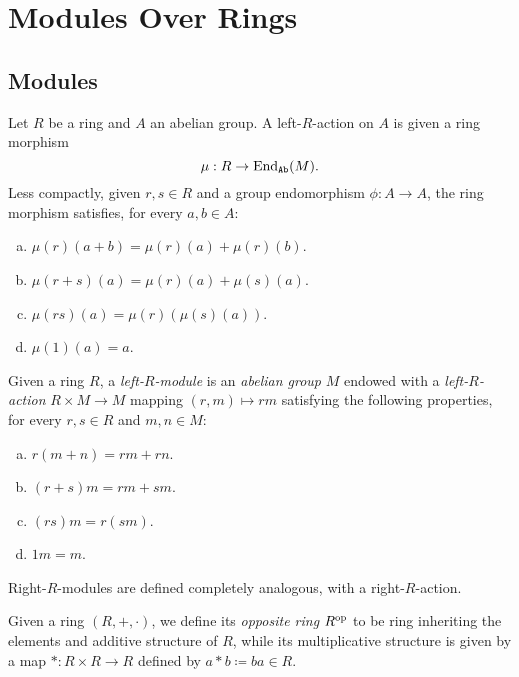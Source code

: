 \section{Modules Over Rings}

\subsection{Modules}

\begin{definition}
    \label{def:ring-action}
    Let \(R\) be a ring and \(A\) an abelian group. A left-\(R\)-action on \(A\) is
    given a ring morphism
    \[
        \mu: R \to \operatorname{End}_{{\texttt{Ab}}}(M).
    \]
    Less compactly, given \(r, s \in R\) and a group endomorphism \(\phi: A \to A\),
    the ring morphism satisfies, for every \(a, b \in A\):
    \begin{enumerate}[(a)]\setlength\itemsep{0em}
        \item \(\mu(r)(a + b) = \mu(r)(a) + \mu(r)(b)\).
        \item \(\mu(r + s)(a) = \mu(r)(a) + \mu(s)(a)\).
        \item \(\mu(r s)(a) = \mu(r)(\mu(s)(a))\).
        \item \(\mu(1)(a) = a\).
    \end{enumerate}
\end{definition}

\begin{definition}[Module]
    \label{def:module}
    Given a ring \(R\), a \emph{left-\(R\)-module} is an \emph{abelian group} \(M\)
    endowed with a \emph{left-\(R\)-action} \(R \times M \to M\) mapping
    \((r, m) \mapsto r m\) satisfying the following properties, for every
    \(r, s \in R\) and \(m, n \in M\):
    \begin{enumerate}[(a)]\setlength\itemsep{0em}
        \item \(r (m + n) = r m + r n\).
        \item \((r + s) m = r m + s m\).
        \item \((r s) m = r (s m)\).
        \item \(1 m = m\).
    \end{enumerate}
    Right-\(R\)-modules are defined completely analogous, with a right-\(R\)-action.
\end{definition}

\begin{definition}
    \label{def:opposite-ring}
    Given a ring \((R, +, \cdot)\), we define its \emph{opposite ring} \(R^{\mathrm{op}}\)
    to be ring inheriting the elements and additive structure of \(R\), while its
    multiplicative structure is given by a map \(*: R \times R \to R\) defined by
    \(a * b \coloneq b a \in R\).
\end{definition}

